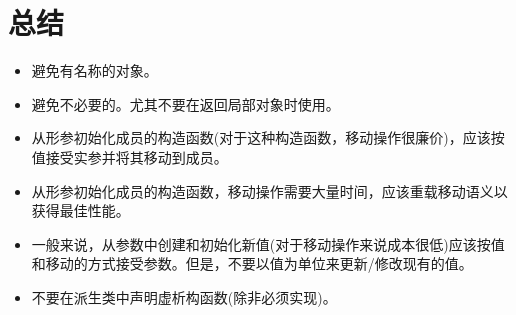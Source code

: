 \section{总结}
\begin{itemize}
	\item 避免有名称的对象。
	\item 避免不必要的。尤其不要在返回局部对象时使用。
	\item 从形参初始化成员的构造函数(对于这种构造函数，移动操作很廉价)，应该按值接受实参并将其移动到成员。
	\item 从形参初始化成员的构造函数，移动操作需要大量时间，应该重载移动语义以获得最佳性能。
	\item 一般来说，从参数中创建和初始化新值(对于移动操作来说成本很低)应该按值和移动的方式接受参数。但是，不要以值为单位来更新/修改现有的值。
	\item 不要在派生类中声明虚析构函数(除非必须实现)。
\end{itemize}


